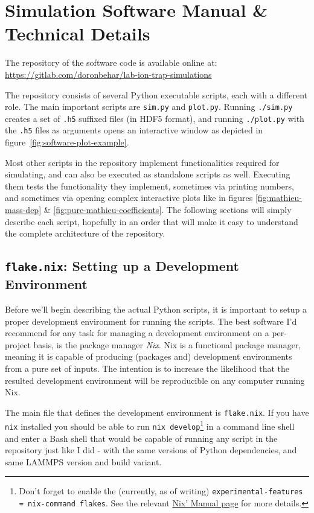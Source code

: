 \chapter{Simulation Software Manual \& Technical Details}

The repository of the software code is available online at: \url{https://gitlab.com/doronbehar/lab-ion-trap-simulations}

The repository consists of several Python executable scripts, each with a different role. The main important scripts are \texttt{sim.py} and \texttt{plot.py}. Running \texttt{./sim.py} creates a set of \texttt{.h5} suffixed files (in HDF5\cite{HDF5} format), and running \texttt{./plot.py} with the \texttt{.h5} files as arguments opens an interactive window as depicted in figure~\ref{fig:software-plot-example}.

Most other scripts in the repository implement functionalities required for simulating, and can also be executed as standalone scripts as well. Executing them tests the functionality they implement, sometimes via printing numbers, and sometimes via opening complex interactive plots like in figures \ref{fig:mathieu-mass-dep} \& \ref{fig:pure-mathieu-coefficients}. The following sections will simply describe each script, hopefully in an order that will make it easy to understand the complete architecture of the repository.

\section{\texttt{flake.nix}: Setting up a Development Environment}

Before we'll begin describing the actual Python scripts, it is important to setup a proper development environment for running the scripts. The best software I'd recommend for any task for managing a development environment on a per-project basis, is the package manager \textit{Nix}\cite{Nix}. Nix is a functional package manager\cite{NixThesis}, meaning it is capable of producing (packages and) development environments from a pure set of inputs. The intention is to increase the likelihood that the resulted development environment will be reproducible\cite{SoftwareReproducitilityThesis} on any computer running Nix.

The main file that defines the development environment is \texttt{flake.nix}. If you have \texttt{nix} installed you should be able to run \texttt{nix develop}\footnote{Don't forget to enable the (currently, as of writing) \texttt{experimental-features = nix-command flakes}. See the relevant \href{https://nix.dev/manual/nix/stable/contributing/experimental-features}{Nix' Manual page} for more details.} in a command line shell and enter a Bash shell that would be capable of running any script in the repository just like I did - with the same versions of Python dependencies, and same LAMMPS version and build variant.

